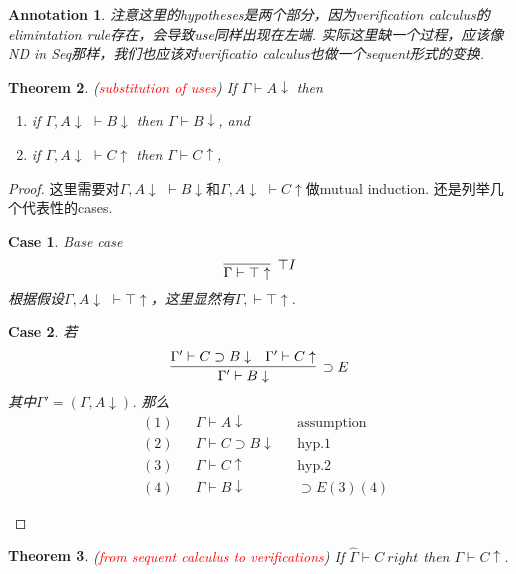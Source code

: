 \documentclass{article}
\theoremstyle{plain}
\newtheorem{theorem}{Theorem}
\newtheorem{annotation}[theorem]{Annotation}
\newtheorem{case}{Case}
\theoremstyle{nonumberplain}
\newtheorem{proof}{Proof}
\newcommand{\redt}[1]{\textcolor{red}{#1}}
\begin{document}
\begin{annotation}
\rm 注意这里的hypotheses是两个部分，因为verification calculus的elimintation rule存在，会导致use同样出现在左端. 实际这里缺一个过程，应该像ND in Seq那样，我们也应该对verificatio calculus也做一个sequent形式的变换. 
\end{annotation}

\begin{theorem}\label{substitution of uses}
\rm (\redt{substitution of uses}) If $\Gamma \vdash A \downarrow$ then 
\begin{enumerate}
	\item if $\Gamma, A \downarrow \,\,\vdash B \downarrow$ then $\Gamma \vdash B \downarrow$, and
	\item if $\Gamma, A \downarrow \,\,\vdash C \uparrow$ then $\Gamma \vdash C \uparrow$,
\end{enumerate}
\end{theorem}

\begin{proof}
\rm 这里需要对$\Gamma, A \downarrow \,\,\vdash B \downarrow$和$\Gamma, A \downarrow \,\,\vdash C \uparrow$做mutual induction. 还是列举几个代表性的cases.
\begin{case}Base case
$$
\infer[\top I]{\Gamma \vdash \top \uparrow}{}
$$
根据假设$\Gamma, A \downarrow \,\,\vdash \top \uparrow$，这里显然有$\Gamma, \vdash \top \uparrow$.
\end{case}
\begin{case}若
$$
\infer[\supset E]{\Gamma' \vdash B\downarrow}{\Gamma' \vdash C \supset B \downarrow & \Gamma' \vdash C \uparrow}
$$
其中$\Gamma' = (\Gamma, A\downarrow)$. 那么
$$
\begin{aligned}
&(1) && \Gamma \vdash A \downarrow && \text{assumption} \\
&(2) && \Gamma \vdash C \supset B \downarrow && \text{hyp}.1 \\
&(3) && \Gamma \vdash C \uparrow && \text{hyp}.2 \\
&(4) && \Gamma \vdash B \downarrow && \supset E (3)(4)     
\end{aligned}
$$
\end{case}
\end{proof}

\begin{theorem}\label{seq-to-vu}
\rm (\redt{from sequent calculus to verifications}) If $\widehat{\Gamma} \vdash C~right$ then $\Gamma \vdash C \uparrow$. 
\end{theorem}
\end{document}
